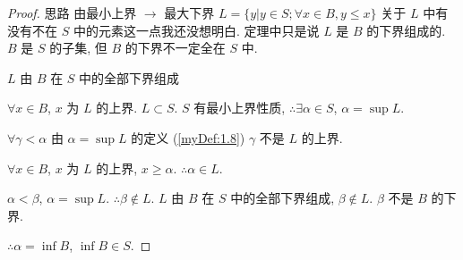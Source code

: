 
    \begin{proof}
思路 由最小上界 $\rightarrow $ 最大下界
$L = \{y| y\in S; \forall x\in B, y\leq x\}$
    关于 $L$ 中有没有不在 $S$ 中的元素这一点我还没想明白. 定理中只是说 $L$ 是 $B$ 的下界组成的. $B$ 是 $S$ 的子集, 但 $B$ 的下界不一定全在 $S$ 中. 

$L$ 由 $B$ 在 $S$ 中的全部下界组成

$\forall x\in B$, $x$ 为 $L$ 的上界. $L\subset S$.
$S$ 有最小上界性质,
$\therefore \exists \alpha\in S$, $\alpha = \sup L$.

$\forall \gamma <\alpha$ 由 $\alpha = \sup L$ 的定义 (\ref{myDef:1.8})
$\gamma$ 不是 $L$ 的上界.

$\forall x \in B$, $x$ 为 $L$ 的上界, $x \geq \alpha$. $\therefore \alpha \in L$.

$\alpha < \beta$, $\alpha = \sup L$. $\therefore \beta \not\in L$.
$L$ 由 $B$ 在 $S$ 中的全部下界组成, $\beta \not\in L$.
$\beta$ 不是 $B$ 的下界.

$\therefore \alpha = \inf B$, $\inf B\in S$.
    \end{proof}

